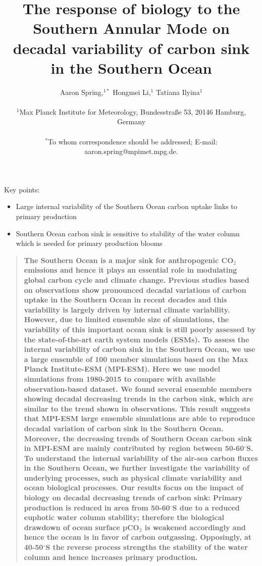 \documentclass[12pt]{article}
\title{The response of biology to the Southern Annular Mode on decadal variability of carbon sink in the Southern Ocean}
\author
{Aaron Spring,$^{1\ast}$ Hongmei Li,$^{1}$ Tatiana Ilyina$^{1}$\\
\\
\normalsize{$^{1}$Max Planck Institute for Meteorology, Bundesstraße 53, 20146 Hamburg, Germany}\\
\\
\normalsize{$^\ast$To whom correspondence should be addressed; E-mail:  aaron.spring@mpimet.mpg.de.}
}
\date{}
\newenvironment{sciabstract}{%
\begin{quote} \bf}
{\end{quote}}
\begin{document}
 


\baselineskip24pt


\maketitle 

Key points:

\begin{itemize}
\item Large internal variability of the Southern Ocean carbon uptake links to primary production
\item Southern Ocean carbon sink is sensitive to stability of the water column which is needed for primary production blooms
\end{itemize}



\newpage

\begin{sciabstract}
  The Southern Ocean is a major sink for anthropogenic CO$_2$ emissions and hence it plays an essential role in modulating global carbon cycle and climate change. Previous studies based on observations show pronounced decadal variations of carbon uptake in the Southern Ocean in recent decades and this variability is largely driven by internal climate variability. However, due to limited ensemble size of simulations, the variability of this important ocean sink is still poorly assessed by the state-of-the-art earth system models (ESMs). To assess the internal variability of carbon sink in the Southern Ocean, we use a large ensemble of 100 member simulations based on the Max Planck Institute-ESM (MPI-ESM). Here we use model simulations from 1980-2015 to compare with available observation-based dataset. We found several ensemble members showing decadal decreasing trends in the carbon sink, which are similar to the trend shown in observations. This result suggests that MPI-ESM large ensemble simulations are able to reproduce decadal variation of carbon sink in the Southern Ocean. Moreover, the decreasing trends of Southern Ocean carbon sink in MPI-ESM are mainly contributed by region between 50-60$^\circ$S. To understand the internal variability of the air-sea carbon fluxes in the Southern Ocean, we further investigate the variability of underlying processes, such as physical climate variability and ocean biological processes. Our results focus on the impact of biology on decadal decreasing trends of carbon sink: Primary production is reduced in area from 50-60$^\circ$S due to a reduced euphotic water column stability; therefore the biological drawdown of ocean surface pCO$_2$ is weakened accordingly and hence the ocean is in favor of carbon outgassing. Opposingly, at 40-50$^\circ$S the reverse process strengths the stability of the water column and hence increases primary production. 
  
\end{sciabstract}
\end{document}
